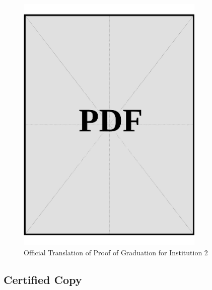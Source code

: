\begin{figure}[h]
    \centering
    \includegraphics[page=1, width=0.8\textwidth]{../application-docs/applicant/post-secondary-institutions/institution-2/proof-of-graduation/official-translations.pdf}
    \caption{Official Translation of Proof of Graduation for Institution 2}
    \label{fig:institution-2-proof-of-graduation-official-translation}
\end{figure}

\vspace*{\fill}
\clearpage

\subsection*{Certified Copy}
\vspace*{\fill}

